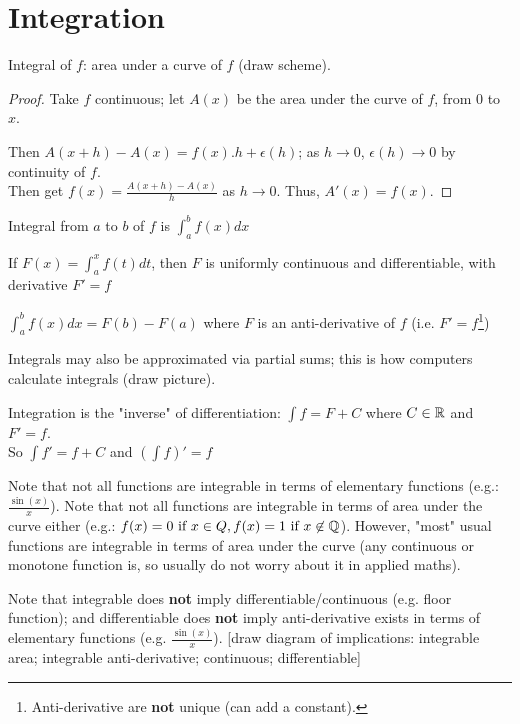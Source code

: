 \chapter{Integration}

Integral of $f$: area under a curve of $f$ (draw scheme).

\begin{proof}
	Take $f$ continuous;
	let $A(x)$ be the area under the curve of $f$, from $0$ to $x$.
	
	Then $A(x+h) - A(x) = f(x).h + \epsilon(h)$; as $h \to 0$, $\epsilon(h) \to 0$ by continuity of $f$.\\
	Then get $f(x) = \frac{A(x+h) -A(x)}{h}$ as $h \to 0$.
	Thus, $A'(x) = f(x)$.
\end{proof}
\begin{notation}
	Integral from $a$ to $b$ of $f$ is $\int_{a}^{b} f(x) dx$
\end{notation}
\begin{theorem}
	If $F(x) = \int_{a}^{x} f(t) dt$, then $F$ is uniformly continuous and differentiable, with derivative $F' = f$
\end{theorem}
\begin{corollary}
	$\int_{a}^{b} f(x) dx = F(b) - F(a)$ where $F$ is an anti-derivative of $f$ (i.e. $F' = f$\footnote{Anti-derivative are \textbf{not} unique (can add a constant).})
\end{corollary}

Integrals may also be approximated via partial sums; this is how computers calculate integrals (draw picture).

Integration is the "inverse" of differentiation: $\int f = F + C$ where $C \in \mathbb{R}$ and $F' = f$.\\
So $\int f' = f + C$ and $\left( \int f \right)' = f$

Note that not all functions are integrable in terms of elementary functions (e.g.: $\frac{\sin(x)}{x}$).
Note that not all functions are integrable in terms of area under the curve either (e.g.: $f(x)=0 \text{ if } x \in Q, f(x)=1 \text{ if } x \not\in \mathbb{Q}$).
However, "most" usual functions are integrable in terms of area under the curve (any continuous or monotone function is, so usually do not worry about it in applied maths).

Note that integrable does \textbf{not} imply differentiable/continuous (e.g. floor function); and differentiable does \textbf{not} imply anti-derivative exists in terms of elementary functions (e.g. $\frac{\sin(x)}{x}$).
[draw diagram of implications: integrable area; integrable anti-derivative; continuous; differentiable]
